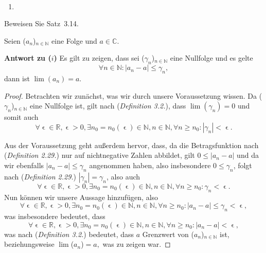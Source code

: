 \bigskip

\begin{lsg}\mbox{ }
\begin{enumerate}[label=$\mathrm{(\roman*)}$, ref=$\mathrm{\roman*}$]
\item
\end{enumerate}
\end{lsg}

\bigskip


\begin{aufg}[6 Punkte]
Beweisen Sie Satz~3.14.
\end{aufg}
 
\bigskip

\begin{lsg}
    Seien ($a_n$)$_{n \in \mathbb{N}}$ eine Folge und $a \in \mathbb{C}.$
    
    \textbf{Antwort zu ($i$)}
        Es gilt zu zeigen, dass sei ($\gamma_n$)$_{n \in \mathbb{N}}$ eine Nullfolge und es gelte $$\forall n \in \mathbb{N}: |a_n - a| \le         \gamma_n,$$dann ist $\lim(a_n)=a.$
    
    \begin{proof}
        Betrachten wir zun\"achst, was wir durch unsere Voraussetzung wissen. Da ($\gamma_n$)$_{n \in \mathbb{N}}$ eine Nullfolge ist, gilt nach (\textit{Definition 3.2.}), dass $\lim(\gamma_n)=0$ und somit auch $$\forall \upvarepsilon \in \mathbb{R}, \upvarepsilon > 0, \exists n_0 = n_0(\upvarepsilon) \in \mathbb{N}, n \in \mathbb{N}, \forall n \ge n_0 : |\gamma_n| < \upvarepsilon.$$
    
        Aus der Voraussetzung geht au{\ss}erdem hervor, dass, da die Betragsfunktion nach (\textit{Definition 2.29.}) nur auf nichtnegative Zahlen abbildet, gilt $0 \le |a_n - a|$ und da wir ebenfalls $|a_n - a| \le \gamma_n$ angenommen haben, also insbesondere $0 \le \gamma_n$, folgt nach (\textit{Definition 2.29.}) $|\gamma_n| = \gamma_n$, also auch $$\forall \upvarepsilon \in \mathbb{R}, \upvarepsilon > 0, \exists n_0 = n_0(\upvarepsilon) \in \mathbb{N}, n \in \mathbb{N}, \forall n \ge n_0 : \gamma_n < \upvarepsilon.$$Nun k\"onnen wir unsere Aussage hinzuf\"ugen, also $$\forall \upvarepsilon \in \mathbb{R}, \upvarepsilon > 0, \exists n_0 = n_0(\upvarepsilon) \in \mathbb{N}, n \in \mathbb{N}, \forall n \ge n_0 : |a_n - a| \le \gamma_n < \upvarepsilon,$$was insbesondere bedeutet, dass $$\forall \upvarepsilon \in \mathbb{R}, \upvarepsilon > 0, \exists n_0 = n_0(\upvarepsilon) \in \mathbb{N}, n \in \mathbb{N}, \forall n \ge n_0 : |a_n - a| < \upvarepsilon,$$was nach (\textit{Definition 3.2.}) bedeutet, dass $a$ Grenzwert von ($a_n$)$_{n \in \mathbb{N}}$ ist, beziehungsweise $\lim$($a_n$)$=a,$ was zu zeigen war.
    \end{proof}
    

\end{lsg}
